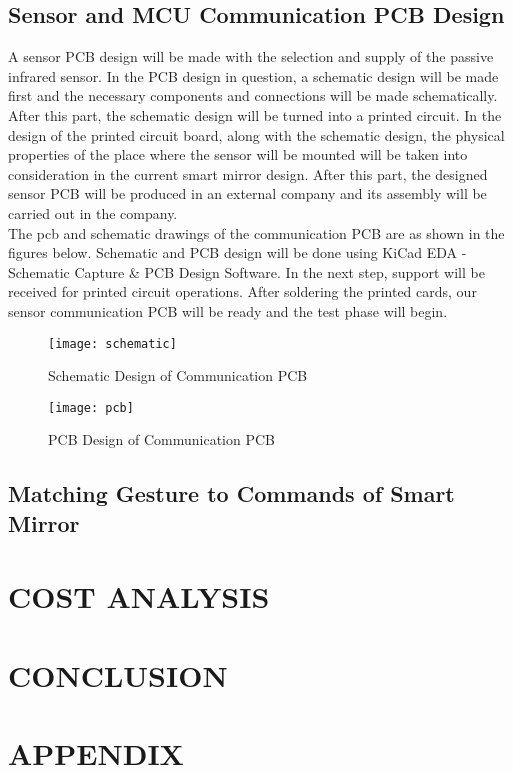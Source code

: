 \documentclass[thesis]{deutez}
\begin{document}
\section{Sensor and MCU Communication PCB Design}
A sensor PCB design will be made with the selection and supply of the passive infrared sensor. In the PCB design in question, a schematic design will be made first and the necessary components and connections will be made schematically. After this part, the schematic design will be turned into a printed circuit. In the design of the printed circuit board, along with the schematic design, the physical properties of the place where the sensor will be mounted will be taken into consideration in the current smart mirror design. After this part, the designed sensor PCB will be produced in an external company and its assembly will be carried out in the company.\\
The pcb and schematic drawings of the communication PCB are as shown in the figures below. Schematic and PCB design will be done using KiCad EDA - Schematic Capture \& PCB Design Software. In the next step, support will be received for printed circuit operations. After soldering the printed cards, our sensor communication PCB will be ready and the test phase will begin. \\
\begin{figure}[h!]
	\centering
	\texttt{[image: schematic]}
	\caption{Schematic Design of Communication PCB}
\end{figure}
\FloatBarrier
\begin{figure}[h!]
	\centering
	\texttt{[image: pcb]}
	\caption{PCB Design of Communication PCB}
\end{figure}
\FloatBarrier
\section{Matching Gesture to Commands of Smart Mirror}
\chapter{COST ANALYSIS}
\chapter{CONCLUSION}


\chapter{APPENDIX}
\end{document}
